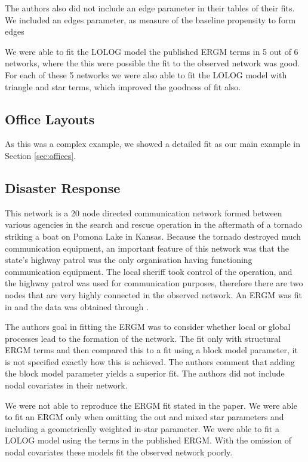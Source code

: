 \documentclass[
]{statsoc}
\begin{document}
The authors also did not include an edge parameter in their tables of
their fits. We included an edges parameter, as measure of the baseline
propensity to form edges

We were able to fit the LOLOG model the published ERGM terms in 5 out of
6 networks, where the this were possible the fit to the observed network
was good. For each of these 5 networks we were also able to fit the
LOLOG model with triangle and star terms, which improved the goodness of
fit also.

\subsection{Office Layouts}

As this was a complex example, we showed a detailed fit as our main
example in Section \ref{sec:offices}.

\subsection{Disaster Response}

This network is a 20 node directed communication network formed between
various agencies in the search and rescue operation in the aftermath of
a tornado striking a boat on Pomona Lake in Kansas. Because the tornado
destroyed much communication equipment, an important feature of this
network was that the state's highway patrol was the only organisation
having functioning communication equipment. The local sheriff took
control of the operation, and the highway patrol was used for
communication purposes, therefore there are two nodes that are very
highly connected in the observed network. An ERGM was fit in
\cite{Doreian2012} and the data was obtained through
\cite{DisasterData}.

The authors goal in fitting the ERGM was to consider whether local or
global processes lead to the formation of the network. The fit only with
structural ERGM terms and then compared this to a fit using a block
model parameter, it is not specified exactly how this is achieved. The
authors comment that adding the block model parameter yields a superior
fit. The authors did not include nodal covariates in their network.

We were not able to reproduce the ERGM fit stated in the paper. We were
able to fit an ERGM only when omitting the out and mixed star parameters
and including a geometrically weighted in-star parameter. We were able
to fit a LOLOG model using the terms in the published ERGM. With the
omission of nodal covariates these models fit the observed network
poorly.
\end{document}
